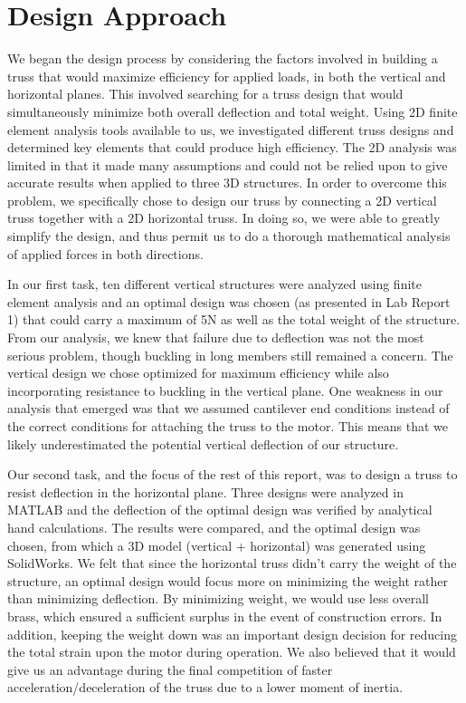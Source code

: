 \section{Design Approach}
\label{sec:b}

We began the design process by considering the factors involved in building a truss that would maximize efficiency for applied loads, in both the vertical and horizontal planes. 
This involved searching for a truss design that would simultaneously minimize both overall deflection and total weight. 
Using 2D finite element analysis tools available to us, we investigated different truss designs and determined key elements that could produce high efficiency. 
The 2D analysis was limited in that it made many assumptions and could not be relied upon to give accurate results when applied to three 3D structures. 
In order to overcome this problem, we specifically chose to design our truss by connecting a 2D vertical truss together with a 2D horizontal truss. 
In doing so, we were able to greatly simplify the design, and thus permit us to do a thorough mathematical analysis of applied forces in both directions. 

In our first task, ten different vertical structures were analyzed using finite element analysis and an optimal design was chosen (as presented in Lab Report 1) that could carry a maximum of 5N as well as the total weight of the structure. 
From our analysis, we knew that failure due to deflection was not the most serious problem, though buckling in long members still remained a concern. 
The vertical design we chose optimized for maximum efficiency while also incorporating resistance to buckling in the vertical plane. 
One weakness in our analysis that emerged was that we assumed cantilever end conditions instead of the correct conditions for attaching the truss to the motor. 
This means that we likely underestimated the potential vertical deflection of our structure. %

Our second task, and the focus of the rest of this report, was to design a truss to resist deflection in the horizontal plane. 
Three designs were analyzed in MATLAB %
and the deflection of the optimal design was verified by analytical hand calculations. 
The results were compared, and the optimal design was chosen, from which a 3D model (vertical + horizontal) was generated using SolidWorks. 
We felt that since the horizontal truss didn't carry the weight of the structure, an optimal design would focus more on minimizing the weight rather than minimizing deflection. 
By minimizing weight, we would use less overall brass, which ensured a sufficient surplus in the event of construction errors. 
In addition, keeping the weight down was an important design decision for reducing the total strain upon the motor during operation. 
We also believed that it would give us an advantage during the final competition of faster acceleration/deceleration of the truss due to a lower moment of inertia.

